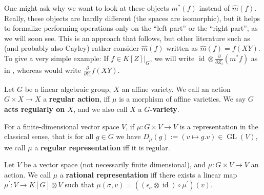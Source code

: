 \begin{remark}
One might ask why we want to look at these objects $ m^\ast \left( f \right) $ instead of $ \hat{m} \left( f \right) $.
Really, these objects are hardly different (the spaces are isomorphic), but it helps to formalize performing operations only on the ``left part'' or the ``right part'', as we will soon see.
This is an approach that \cite{DK15} follows, but other literature such as \cite{Stu08} (and probably also Cayley) rather consider $ \hat{m} \left( f \right) $ written as $ \hat{m} \left( f \right) = f (XY) $.
To give a very simple example:
If $f \in \left. K[Z] \right|_G$, we will write $\operatorname{id} \otimes \frac{\partial}{\partial Z_i} (m^\ast f)$ as in \cite{DK15}, whereas \cite{Stu08} would write $\frac{\partial}{\partial Y_i} f(XY)$.
\end{remark}

\begin{definition}
  Let $G$ be a linear algebraic group, $X$ an affine variety.
  We call an action $G \times X \longrightarrow X$ a \textbf{regular action}, iff $\mu$ is a morphism of affine varieties.
  We say \textbf{$ G $ acts regularly on $ X $}, and we also call $X$ a \textbf{$G$-variety}.

  For a finite-dimensional vector space $V$, if $\mu \colon G \times V \longrightarrow V$ is a representation in the classical sense, that is for all $g \in G$ we have $D_\mu (g) := (v \mapsto g.v) \in \operatorname{GL}(V)$, we call $\mu$ a \textbf{regular representation} iff it is regular.
  
\end{definition}

\begin{definition}\label{rr}
  Let $V$ be a vector space (not necessarily finite dimensional), and $ \mu : G \times V \longrightarrow V $ an action.
  We call $ \mu $ a \textbf{rational representation} iff there exists a linear map $ \mu^\prime \colon V \longrightarrow K[G] \otimes V $ such that $ \mu \left( \sigma , v \right) = \left( \left( \epsilon_\sigma \otimes \operatorname{id} \right) \circ \mu^\prime \right) \left(v\right) $.
\end{definition}


